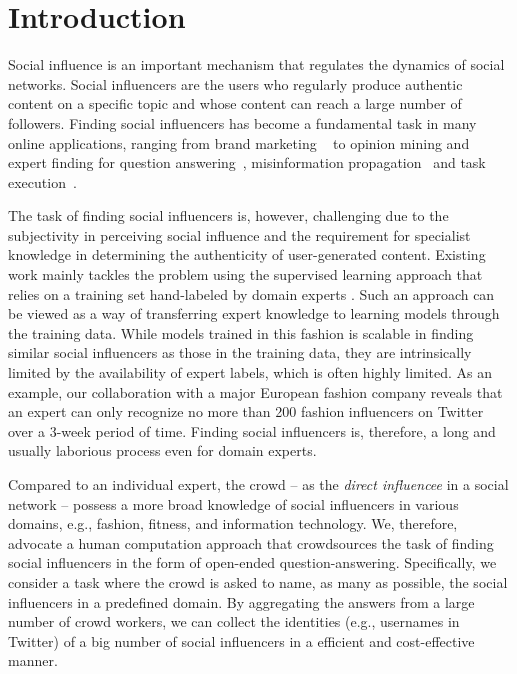 \section{Introduction}

Social influence is an important mechanism that regulates the dynamics of social networks. Social influencers are the users who regularly produce authentic content on a specific topic and whose content can reach a large number of followers. Finding social influencers has become a fundamental task in many online applications, ranging from brand marketing
~\cite{bond201261,richardson2002mining,van2007new} to opinion mining \cite{pang2008opinion,li2012mining} and expert finding for question 
answering~\cite{riahi2012finding}, misinformation propagation~\cite{DBLP:conf/icde/SongHL17} and task execution~\cite{sun2014analyzing,miao2010generative}.  

The task of finding social influencers is, however, challenging due to the subjectivity in perceiving social influence and the requirement for specialist knowledge in determining the authenticity of user-generated content. Existing work mainly tackles the problem using the supervised learning approach that relies on a training set hand-labeled by domain experts \cite{Cheng2014,Lehmann2013,wei2016learning}.  Such an approach can be viewed as a way of transferring expert knowledge to learning models through the training data. While models trained in this fashion is scalable in finding similar social influencers as those in the training data, they are intrinsically limited by the availability of expert labels, which is often highly limited. As an example, our collaboration with a major European fashion company reveals that an expert can only recognize no more than 200 fashion influencers on Twitter over a 3-week period of time. Finding social influencers is, therefore, a long and usually laborious process even for domain experts.

Compared to an individual expert, the crowd -- as the \emph{direct influencee} in a social network -- possess a more broad knowledge of social influencers in various domains, e.g., fashion, fitness, and information technology. We, therefore, advocate a human computation approach that crowdsources the task of finding social influencers in the form of open-ended question-answering. Specifically, we consider a task where the crowd is asked to name, as many as possible, the social influencers in a predefined domain. By aggregating the answers from a large number of crowd workers, we can collect the identities (e.g., usernames in Twitter) of a big number of social influencers in a efficient and cost-effective manner. 

